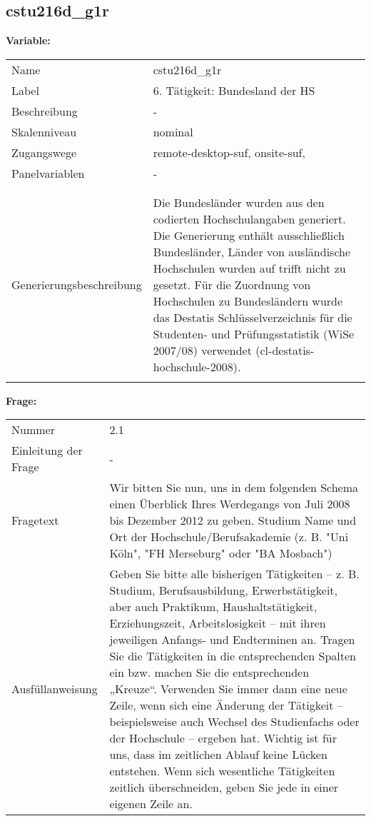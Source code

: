 	
	
	\subsection{cstu216d\_g1r}
	\label{subSection:cstu216d_g1r}

	\noindent\textbf{Variable:}\\
		\begin{tabular}{lL{11.3cm}}
			\label{tableVariable:cstu216d_g1r}
			Name & cstu216d\_g1r \\
			Label & 6. Tätigkeit: Bundesland der HS \\
			Beschreibung & - \\
			Skalenniveau & nominal \\
			Zugangswege &
				remote-desktop-suf,
				onsite-suf,
 \\
			Panelvariablen & -
			 \\
			 \\
 \\
					Generierungsbeschreibung & Die Bundesländer wurden aus den codierten Hochschulangaben generiert. Die Generierung enthält ausschließlich Bundesländer, Länder von ausländische Hochschulen wurden auf trifft nicht zu gesetzt. Für die Zuordnung von Hochschulen zu Bundesländern wurde das Destatis Schlüsselverzeichnis für die Studenten- und Prüfungsstatistik (WiSe 2007/08) verwendet (cl-destatis-hochschule-2008).
				 \\	
			 \\
		\end{tabular}

		\vspace*{1 cm}
		\noindent\textbf{Frage:}\\
		\begin{tabular}{lL{11.3cm}}
			\label{tableQuestion:cstu216d_g1r}
			Nummer & 2.1 \\
			Einleitung der Frage & - \\
			Fragetext & Wir bitten Sie nun, uns in dem folgenden Schema einen Überblick Ihres Werdegangs von Juli 2008 bis Dezember 2012 zu geben.
Studium
Name und Ort der Hochschule/Berufsakademie
(z. B. "Uni Köln", "FH Merseburg" oder "BA Mosbach") \\
			Ausfüllanweisung & Geben Sie bitte alle bisherigen Tätigkeiten – z. B. Studium, Berufsausbildung, Erwerbstätigkeit, aber auch Praktikum, Haushaltstätigkeit,
Erziehungszeit, Arbeitslosigkeit – mit ihren jeweiligen Anfangs- und Endterminen an. Tragen Sie die Tätigkeiten in die entsprechenden Spalten ein bzw. machen Sie die entsprechenden „Kreuze“. Verwenden Sie immer dann eine neue Zeile, wenn sich eine Änderung der Tätigkeit – beispielsweise auch Wechsel des Studienfachs oder der Hochschule – ergeben hat. Wichtig ist für uns, dass im zeitlichen Ablauf keine Lücken entstehen. Wenn sich wesentliche Tätigkeiten zeitlich überschneiden, geben Sie jede in einer eigenen Zeile an. \\
		\end{tabular}





